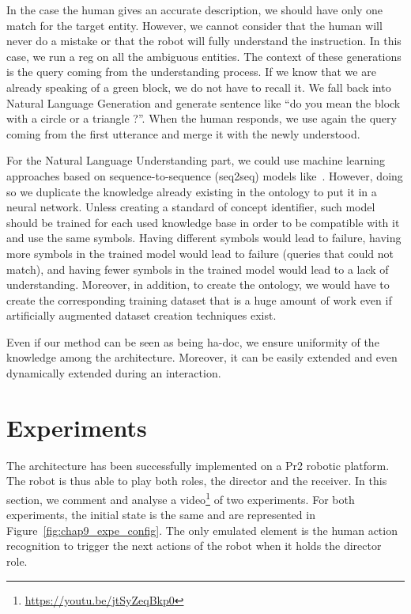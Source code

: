 In the case the human gives an accurate description, we should have only one match for the target entity. However, we cannot consider that the human will never do a mistake or that the robot will fully understand the instruction. In this case, we run a \acrshort{reg} on all the ambiguous entities. The context of these generations is the \sparql{} query coming from the understanding process. If we know that we are already speaking of a green block, we do not have to recall it. We fall back into Natural Language Generation and generate sentence like ``do you mean the block with a circle or a triangle ?''. When the human responds, we use again the \sparql{} query coming from the first utterance and merge it with the newly understood.

For the Natural Language Understanding part, we could use machine learning approaches based on sequence-to-sequence (seq2seq) models like~\cite{panchbhai_2020_exploring}. However, doing so we duplicate the knowledge already existing in the ontology to put it in a neural network. Unless creating a standard of concept identifier, such model should be trained for each used knowledge base in order to be compatible with it and use the same symbols. Having different symbols would lead to failure, having more symbols in the trained model would lead to failure (queries that could not match), and having fewer symbols in the trained model would lead to a lack of understanding. Moreover, in addition, to create the ontology, we would have to create the corresponding training dataset that is a huge amount of work even if artificially augmented dataset creation techniques exist.

Even if our method can be seen as being ha-doc, we ensure uniformity of the knowledge among the architecture. Moreover, it can be easily extended and even dynamically extended during an interaction.

\section{Experiments}

The architecture has been successfully implemented on a Pr2 robotic platform. The robot is thus able to play both roles, the director and the receiver. In this section, we comment and analyse a video\footnote{\url{https://youtu.be/jtSyZeqBkp0}} of two experiments. For both experiments, the initial state is the same and are represented in Figure~\ref{fig:chap9_expe_config}. The only emulated element is the human action recognition to trigger the next actions of the robot when it holds the director role.

